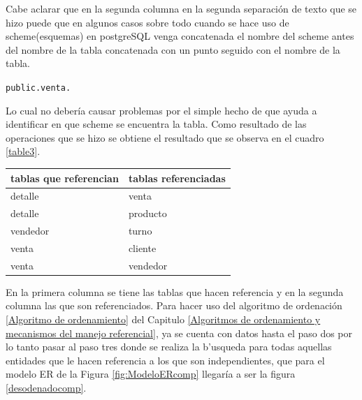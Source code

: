 Cabe aclarar que en la segunda columna en la segunda separaci\'on de texto que se hizo puede que en algunos casos sobre todo cuando se hace uso de scheme(esquemas) en postgreSQL venga concatenada el nombre del scheme antes del nombre de la tabla concatenada con un punto seguido con el nombre de la tabla.

\texttt{public.venta.}

Lo cual no deber\'ia  causar problemas por el simple hecho de que ayuda a identificar en que scheme se encuentra la tabla. Como resultado de las operaciones que se hizo se obtiene el resultado que se observa en el cuadro \ref{table3}.
\begin{center}
\scriptsize
  \renewcommand{\arrayrulewidth}{1pt}
  \label{table3} %
\begin{tabular}{|p{40mm}|p{98mm}|}
\hline
\textbf{tablas que referencian} & \textbf{tablas referenciadas} \\ \hline
detalle                         & venta                         \\ \hline
detalle                         & producto                      \\ \hline
vendedor                        & turno                         \\ \hline
venta                        & cliente                       \\ \hline
venta                           & vendedor                      \\ \hline
\end{tabular}
\end{center}
En la primera columna se tiene las tablas que hacen referencia y en la segunda columna las que son referenciados. Para hacer uso del algoritmo de ordenaci\'on \ref{Algoritmo de ordenamiento} del Capitulo \ref{Algoritmos de ordenamiento y mecanismos del manejo referencial},  ya se cuenta con datos hasta el paso dos por lo tanto pasar al paso tres donde se realiza la b'usqueda para todas aquellas entidades que le hacen referencia a los que son independientes, que para el modelo ER de la Figura \ref{fig:ModeloERcomp} llegar\'ia a ser la figura \ref{desodenadocomp}.
